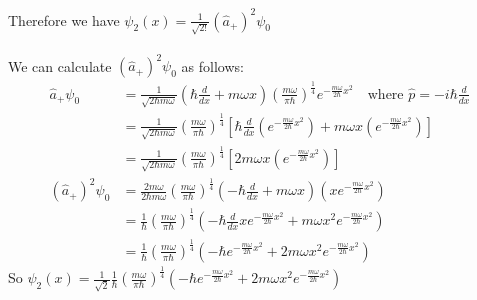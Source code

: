 \documentclass{article}
\begin{document}
\noindent Therefore we have \(\psi_2(x) = \frac{1}{\sqrt{2!}} (\hat{a}_+)^2 \psi_0\)
\\
\\
\noindent We can calculate \((\hat{a}_+)^2 \psi_0\) as follows:
\begin{align*}
	\hat{a}_+\psi_0                 & = \frac{1}{\sqrt{2 \hbar m \omega}} \left(\hbar \frac{d}{dx} + m \omega x\right) \left(\frac{m \omega}{\pi \hbar}\right)^{\frac{1}{4}} e^{-\frac{m \omega}{2\hbar}x^2}\quad \text{where } \hat{p} = -i\hbar \frac{d}{dx}         \\
	                                & = \frac{1}{\sqrt{2 \hbar m \omega}} \left(\frac{m \omega}{\pi \hbar}\right)^{\frac{1}{4}} \left[\hbar \frac{d}{dx} \left(e^{-\frac{m \omega}{2\hbar}x^2}\right) + m \omega x \left(e^{-\frac{m \omega}{2\hbar}x^2}\right)\right] \\
	                                & = \frac{1}{\sqrt{2 \hbar m \omega}} \left(\frac{m \omega}{\pi \hbar}\right)^{\frac{1}{4}} \left[2m\omega x \left(e^{-\frac{m \omega}{2\hbar}x^2}\right)\right]                                                                   \\
	\left(\hat{a}_+\right)^2 \psi_0 & = \frac{2 m \omega}{2 \hbar m \omega} \left(\frac{m \omega}{\pi \hbar}\right)^{\frac{1}{4}} \left(- \hbar \frac{d}{dx} + m \omega x \right) \left(x e^{-\frac{m \omega}{2\hbar}x^2} \right)                                      \\
	                                & = \frac{1}{\hbar} \left(\frac{m \omega}{\pi \hbar}\right)^{\frac{1}{4}} \left(- \hbar \frac{d}{dx} x e^{-\frac{m \omega}{2\hbar}x^2} + m \omega x^2 e^{-\frac{m \omega}{2\hbar}x^2} \right)                                      \\
	                                & = \frac{1}{\hbar} \left(\frac{m \omega}{\pi \hbar}\right)^{\frac{1}{4}} \left(-\hbar e^{-\frac{m \omega}{2\hbar}x^2} + 2 m \omega x^2 e^{-\frac{m \omega}{2\hbar}x^2}\right)
\end{align*}
So \(\psi_2(x) = \frac{1}{\sqrt{2}} \frac{1}{\hbar} \left(\frac{m \omega}{\pi \hbar}\right)^{\frac{1}{4}} \left(-\hbar e^{-\frac{m \omega}{2\hbar}x^2} + 2 m \omega x^2 e^{-\frac{m \omega}{2\hbar}x^2}\right) \)
\end{document}
